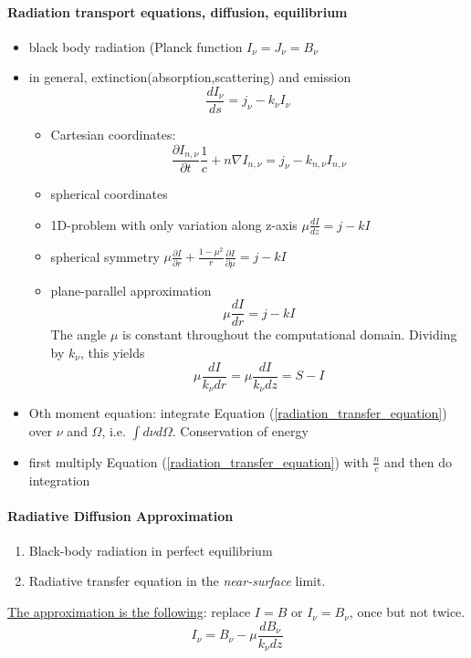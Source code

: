 \documentclass[../main/main.tex]{subfiles}
\begin{document}
\paragraph{Radiation transport equations, diffusion, equilibrium}
\begin{itemize}
\item black body radiation (Planck function $I_{\nu} = J_{\nu} = B_{\nu}$
\item in general, extinction(absorption,scattering) and emission
\begin{equation}
\frac{dI_{\nu}}{ds} = j_{\nu} - k_{\nu}I_{\nu}
\end{equation}
\begin{itemize}
\item Cartesian coordinates: 
\begin{equation}
\boxed{\frac{\partial I_{n,\nu}}{\partial t}\frac{1}{c} + n \nabla I_{n,\nu} = j_{\nu} - k_{n,\nu}I_{n,\nu}}
\label{radiation_transfer_equation}
\end{equation}
\item spherical coordinates 
\item 1D-problem with only variation along z-axis $\mu \frac{dI}{dz}  = j -kI$
\item spherical symmetry $\mu \frac{\partial I}{\partial r} + \frac{1-\mu^2}{r}\frac{\partial I}{\partial \mu} = j-kI$
\item plane-parallel approximation 
\begin{equation}
\boxed{\mu \frac{d I}{dr} = j - kI} 
\label{plane_parallel_radiation}
\end{equation}
The angle $\mu$ is constant throughout the computational domain.
Dividing by $k_{\nu}$, this yields 
\begin{equation}
\mu \frac{dI}{k_{\nu} dr} =  \mu \frac{dI}{k_{\nu} dz} = S-I
\end{equation}


\end{itemize}
\item Oth moment equation: integrate Equation (\ref{radiation_transfer_equation}) over $\nu$ and $\Omega$, i.e. $\int d\nu d\Omega$. Conservation of energy
\item first multiply Equation (\ref{radiation_transfer_equation}) with $\frac{n}{c}$ and then do integration
\end{itemize}

\paragraph{Radiative Diffusion Approximation}
\begin{enumerate}
\item Black-body radiation in perfect equilibrium
\item Radiative transfer equation in the \textit{near-surface} limit.
\end{enumerate}
\underline{The approximation is the following}: replace $\boxed{I = B}$ or $I_{\nu} = B_{\nu}$, once but not twice.
\begin{equation}
I_{\nu} = B_{\nu} - \mu \frac{dB_{\nu}}{k_{\nu}dz}
\end{equation}
\end{document}
